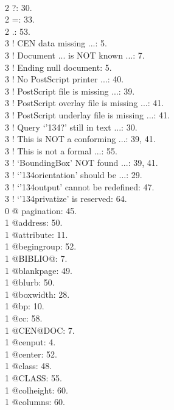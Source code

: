  
\privatize
{}
 

\index
\\2 ?: 30.
\\2 =: 33.
\\2 .: 53.
\newletter{!}
\\3 ! CEN data missing ...: 5.
\\3 ! Document ... is NOT known ...: 7.
\\3 ! Ending null document: 5.
\\3 ! No PostScript printer ...: 40.
\\3 ! PostScript file is missing ...: 39.
\\3 ! PostScript overlay file is missing ...: 41.
\\3 ! PostScript underlay file is missing ...: 41.
\\3 ! Query `\char '134?' still in text ...: 30.
\\3 ! This is NOT a conforming ...: 39, 41.
\\3 ! This is not a formal ...: 55.
\\3 ! `BoundingBox' NOT found ...: 39, 41.
\\3 ! `\char '134orientation' should be ...: 29.
\\3 ! `\char '134output' cannot be redefined: 47.
\\3 ! `\char '134privatize' is reserved: 64.
\\0 @ pagination: 45.
\\1 @address: 50.
\\1 @attribute: 11.
\\1 @begingroup: 52.
\\1 @BIBLIO@: 7.
\\1 @blankpage: 49.
\\1 @blurb: 50.
\\1 @boxwidth: 28.
\\1 @bp: 10.
\\1 @cc: 58.
\\1 @CEN@DOC: 7.
\\1 @cenput: 4.
\\1 @center: 52.
\\1 @class: 48.
\\1 @CLASS: 55.
\\1 @colheight: 60.
\\1 @columns: 60.
